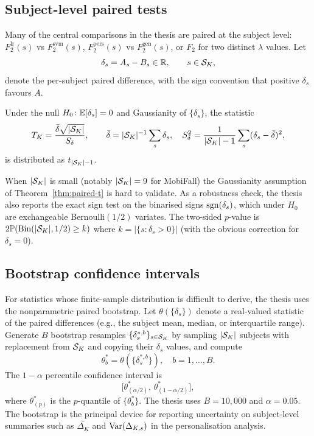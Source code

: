 \subsection{Subject-level paired tests}
\label{subsubsec:paired-tests}

Many of the central comparisons in the thesis are paired at the subject level: $F_2^{\mathrm{lr}}(s)$ vs $F_2^{\mathrm{svm}}(s)$, $F_2^{\mathrm{pers}}(s)$ vs $F_2^{\mathrm{gen}}(s)$, or $F_2$ for two distinct $\lambda$ values. Let
\[
  \delta_s=A_s-B_s\in\mathbb{R},\qquad s\in\mathcal{S}_K,
\]
denote the per-subject paired difference, with the sign convention that positive $\delta_s$ favours $A$.

\begin{theorem}
\label{thm:paired-t}
Under the null $H_0\colon\mathbb{E}[\delta_s]=0$ and Gaussianity of $\{\delta_s\}$, the statistic
\[
  T_K=\frac{\bar\delta\sqrt{|\mathcal{S}_K|}}{S_\delta},
  \qquad
  \bar\delta=|\mathcal{S}_K|^{-1}\sum_s\delta_s,
  \quad
  S_\delta^2=\frac{1}{|\mathcal{S}_K|-1}\sum_s(\delta_s-\bar\delta)^2,
\]
is distributed as $t_{|\mathcal{S}_K|-1}$.
\end{theorem}

\begin{remark}
\label{rem:sign-test}
When $|\mathcal{S}_K|$ is small (notably $|\mathcal{S}_K|=9$ for MobiFall) the Gaussianity assumption of Theorem~\ref{thm:paired-t} is hard to validate. As a robustness check, the thesis also reports the exact sign test on the binarised signs $\operatorname{sgn}(\delta_s)$, which under $H_0$ are exchangeable Bernoulli$(1/2)$ variates. The two-sided $p$-value is $2\mathbb{P}(\mathrm{Bin}(|\mathcal{S}_K|,1/2)\geq k)$ where $k=|\{s:\delta_s>0\}|$ (with the obvious correction for $\delta_s=0$).
\end{remark}

\subsection{Bootstrap confidence intervals}
\label{subsubsec:bootstrap}

For statistics whose finite-sample distribution is difficult to derive, the thesis uses the nonparametric paired bootstrap. Let $\theta(\{\delta_s\})$ denote a real-valued statistic of the paired differences (e.g., the subject mean, median, or interquartile range). Generate $B$ bootstrap resamples $\{\delta_s^{*,b}\}_{s\in\mathcal{S}_K}$ by sampling $|\mathcal{S}_K|$ subjects with replacement from $\mathcal{S}_K$ and copying their $\delta_s$ values, and compute
\[
  \theta_b^*=\theta(\{\delta_s^{*,b}\}),\quad b=1,\ldots,B.
\]
The $1-\alpha$ percentile confidence interval is
\begin{equation}
  \bigl[\theta^*_{(\alpha/2)},\,\theta^*_{(1-\alpha/2)}\bigr],
  \label{eq:bootstrap}
\end{equation}
where $\theta^*_{(p)}$ is the $p$-quantile of $\{\theta_b^*\}$. The thesis uses $B=10{,}000$ and $\alpha=0.05$. The bootstrap is the principal device for reporting uncertainty on subject-level summaries such as $\overline{\Delta_K}$ and $\operatorname{Var}(\Delta_{K,s})$ in the personalisation analysis.

